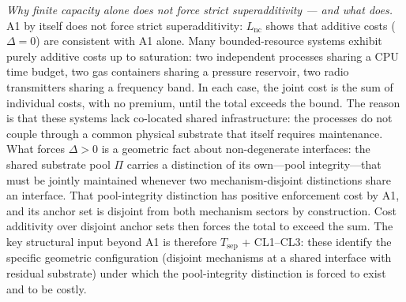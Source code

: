 \documentclass[11pt]{article}
\theoremstyle{remark}
\begin{document}
\smallskip\noindent\textit{Why finite capacity alone does not force strict superadditivity --- and what does.}  A1 by itself does not force strict superadditivity: $L_{\mathrm{nc}}$ shows that additive costs ($\Delta = 0$) are consistent with A1 alone.  Many bounded-resource systems exhibit purely additive costs up to saturation: two independent processes sharing a CPU time budget, two gas containers sharing a pressure reservoir, two radio transmitters sharing a frequency band.  In each case, the joint cost is the sum of individual costs, with no premium, until the total exceeds the bound.  The reason is that these systems lack co-located shared infrastructure: the processes do not couple through a common physical substrate that itself requires maintenance.  What forces $\Delta > 0$ is a geometric fact about non-degenerate interfaces: the shared substrate pool $\Pi$ carries a distinction of its own---pool integrity---that must be jointly maintained whenever two mechanism-disjoint distinctions share an interface.  That pool-integrity distinction has positive enforcement cost by A1, and its anchor set is disjoint from both mechanism sectors by construction.  Cost additivity over disjoint anchor sets then forces the total to exceed the sum.  The key structural input beyond A1 is therefore $T_{\mathrm{sep}}$ + CL1--CL3: these identify the specific geometric configuration (disjoint mechanisms at a shared interface with residual substrate) under which the pool-integrity distinction is forced to exist and to be costly.

\end{document}
